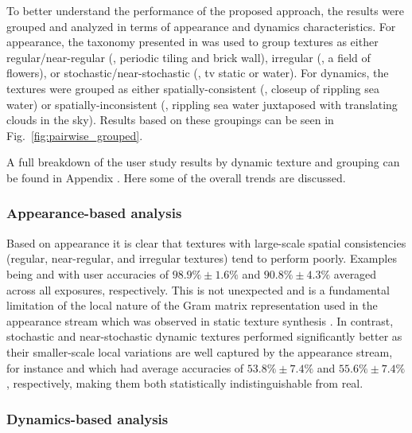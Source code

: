 To better understand the performance of the proposed approach,
the results were grouped and analyzed in terms of
appearance and dynamics characteristics.
For appearance, the taxonomy
presented in \cite{lin2006quantitative} was used to group textures as
either regular/near-regular (\eg, periodic tiling and brick wall), 
irregular (\eg, a field of flowers), or
stochastic/near-stochastic (\eg, tv static or water).
For dynamics, the textures were grouped as either 
spatially-consistent (\eg, closeup of rippling sea water) or 
spatially-inconsistent (\eg, rippling sea water juxtaposed 
with translating clouds in the sky).
Results based on these groupings can be seen in
Fig.\ \ref{fig:pairwise_grouped}.



A full breakdown of the user study results by dynamic texture and 
grouping can be found in Appendix .
Here some of the overall trends are discussed.

\subsubsection{Appearance-based analysis}

Based on appearance it is clear that textures with
large-scale spatial consistencies (regular, near-regular, 
and irregular textures) tend to perform poorly.
Examples being  and  with
user accuracies of $98.9\% \pm 1.6\%$ and $90.8\% \pm 4.3\%$ 
averaged across all exposures, respectively.
This is not unexpected and is a fundamental limitation of the 
local nature of the Gram matrix representation used in the 
appearance stream which was observed in static texture synthesis 
\cite{gatys2015}.
In contrast, stochastic and near-stochastic dynamic textures 
performed significantly better as their smaller-scale local 
variations are well captured by the appearance stream, for 
instance  and  which had 
average accuracies of $53.8\% \pm 7.4\%$ and
$55.6\% \pm 7.4\%$, respectively, making them both 
statistically indistinguishable from real.

\subsubsection{Dynamics-based analysis}

